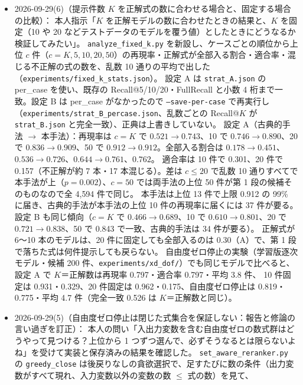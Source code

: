 \documentclass[11pt,a4paper]{jsarticle}
\begin{document}
\begin{itemize}[nosep]
    進捗報告の下書き（設計のみ、2 ページ）は \texttt{docs/ゼミlatexテンプレ/progress\_report\_2026-10-08\_var\_description.tex}。本人の指示で、進捗報告は全ての生成と実験が終わってから書く。
  \item 2026-09-29(6)（提示件数 $K$ を正解式の数に合わせる場合と、固定する場合の比較）：
    本人指示「$K$ を正解モデルの数に合わせたときの結果と、$K$ を固定（10 や 20 などテストデータのモデルを覆う値）としたときにどうなるか検証してみたい」。
    \texttt{analyze\_fixed\_k.py} を新設し、ケースごとの順位から上位 $c$ 件（$c = K, 5, 10, 20, 50$）の再現率・正解式が全部入る割合・適合率・混じる不正解の式の数を、乱数 10 通りの平均で出した（\texttt{experiments/fixed\_k\_stats.json}）。
    設定 A は \texttt{strat\_A.json} の per\_case を使い、既存の Recall@5/10/20・FullRecall と小数 4 桁まで一致。設定 B は per\_case がなかったので \texttt{--save-per-case} で再実行し
    （\texttt{experiments/strat\_B\_percase.json}、乱数ごとの Recall@$K$ が \texttt{strat\_B.json} と完全一致）、正典は上書きしていない。
    設定 A（古典的手法 $\to$ 本手法）：再現率は $c=K$ で $0.521 \to 0.743$、10 で $0.746 \to 0.890$、20 で $0.836 \to 0.909$、50 で $0.912 \to 0.912$。全部入る割合は $0.178 \to 0.451$、$0.536 \to 0.726$、$0.644 \to 0.761$、$0.762$。
    適合率は 10 件で 0.301、20 件で 0.157（不正解が約 7 本・17 本混じる）。差は $c \le 20$ で乱数 10 通りすべてで本手法が上（$p = 0.002$）、$c = 50$ では両手法の上位 50 件が第 1 段の候補そのものなので全 4{,}594 件で同じ。
    本手法は上位 13 件で上限 0.912 の 99\% に届き、古典的手法が本手法の上位 10 件の再現率に届くには 37 件が要る。設定 B も同じ傾向（$c=K$ で $0.466 \to 0.689$、10 で $0.610 \to 0.801$、20 で $0.721 \to 0.838$、50 で 0.843 で一致、古典的手法は 34 件が要る）。
    正解式が 6〜10 本のモデルは、20 件に固定しても全部入るのは 0.30（A）で、第 1 段で落ちた式は何件提示しても戻らない。
    自由度ゼロ停止の実験（学習版逐次モデル・候補 200 件、\texttt{experiments/xd\_dof/}）でも同じモデルで比べると、設定 A で $K$＝正解数は再現率 0.797・適合率 0.797・平均 3.8 件、
    10 件固定は 0.931・0.329、20 件固定は 0.962・0.175、自由度ゼロ停止は 0.819・0.775・平均 4.7 件（完全一致 0.526 は $K$＝正解数と同じ）。
  \item 2026-09-29(5)（自由度ゼロ停止は閉じた式集合を保証しない：報告と修論の言い過ぎを訂正）：
    本人の問い「入出力変数を含む自由度ゼロの数式群はどうやって見つける？上位から 1 つずつ選んで、必ずそうなるとは限らないよね」を受けて実装と保存済みの結果を確認した。
    \texttt{set\_aware\_reranker.py} の \texttt{greedy\_close} は後戻りなしの貪欲選択で、足すたびに数の条件（出力変数がすべて現れ、入力変数以外の変数の数 $\le$ 式の数）を見て、

\end{itemize}
\end{document}
